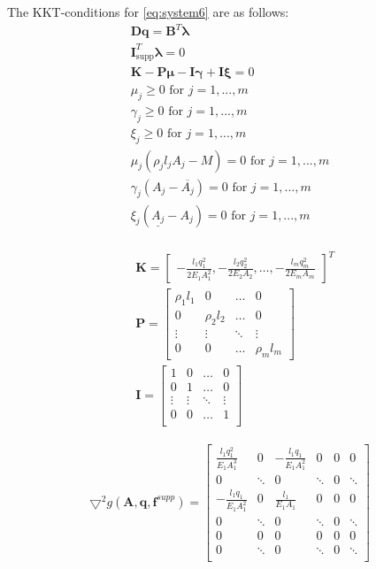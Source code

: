 

The KKT-conditions for \eqref{eq:system6} are as follows:
\begin{equation}
\label{KKT_system6}
\begin{aligned}
\bm{Dq} = \bm{B}^{T}\bm{\lambda}\\
\bm{I}^{T}_{\textrm{supp}}\bm{\lambda} = 0 \\
\bm{K} - \bm{P}\bm{\mu} - \bm{I}\bm{\gamma} + \bm{I}\bm{\xi} = 0 \\
\mu_j \geq 0  \text{ for } j = 1,...,m \\
\gamma_j \geq 0 \text{ for } j = 1,...,m \\
\xi_j \geq 0 \text{ for } j = 1,...,m \\
\mu_j(\rho_{j}l_{j}A_{j}-M) = 0 \text{ for } j = 1,...,m \\
\gamma_{j}(A_{j}-\overline{A_{j}}) = 0 \text{ for } j = 1,...,m \\
\xi_{j}(\underline{A_{j}}-A_{j}) = 0 \text{ for } j = 1,...,m \\
\end{aligned}
\end{equation}

\begin{align*}
&\bm{K} = \begin{bmatrix}
       -\frac{l_{1}q_{1}^2}{2E_{1}A_{1}^2}
       , -\frac{l_{2}q_{2}^2}{2E_{2}A_{2}}, \hdots,-\frac{l_{m}q_{m}^2}{2E_{m}A_{m}}
     \end{bmatrix}^T \\
&\bm{P} = \begin{bmatrix}
\rho_{1}l_{1} &  0  & \ldots & 0\\
0  &  \rho_{2}l_{2} & \ldots & 0\\
\vdots & \vdots & \ddots & \vdots\\
0  &   0       &\ldots & \rho_{m}l_{m}
\end{bmatrix}\\
&\bm{I} = \begin{bmatrix}
1 &  0  & \ldots & 0\\
0  &  1 & \ldots & 0\\
\vdots & \vdots & \ddots & \vdots\\
0  &   0  &\ldots & 1 \\
\end{bmatrix}
\end{align*}

\begin{align*}
\bm{\bigtriangledown}^2 g(\bm{A},\bm{q},\bm{f}^{supp}) =
\left[\begin{array}{cc|cc|cc}
\frac{l_1q_1^2}{E_1A_1^3}&0& -\frac{l_1q_1}{E_1A_1^2} &0 & 0 & 0\\[0.3em]
0 &\ddots &0 & \ddots & 0 & \ddots\\[0.3em] \hline
-\frac{l_1q_1}{E_1A_1^2} & 0 & \frac{l_1}{E_1A_1} & 0 & 0 & 0\\[0.3em]
0 &\ddots & 0 &\ddots & 0 & \ddots\\[0.3em] \hline
0 & 0 & 0 & 0 & 0 & 0 \\[0.3em]
0 & \ddots & 0 & \ddots & 0 & \ddots\\[0.3em]
\end{array}\right]
\end{align*}

